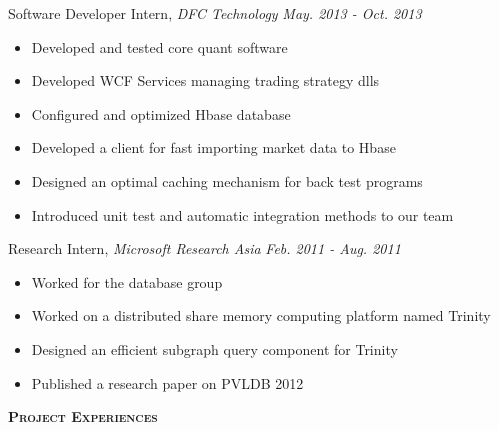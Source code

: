 \documentclass[9pt]{article}
\newenvironment{changemargin}[2]{%
  \begin{list}{}{%
    \setlength{\topsep}{0pt}%
    \setlength{\leftmargin}{#1}%
    \setlength{\rightmargin}{#2}%
    \setlength{\listparindent}{\parindent}%
    \setlength{\itemindent}{\parindent}%
    \setlength{\parsep}{\parskip}%
  }%
  \item[]}{\end{list}
}
\newcommand{\lineover}{
	\begin{changemargin}{-0.05in}{-0.05in}
		\vspace*{-8pt}
		\hrulefill \\
		\vspace*{-2pt}
	\end{changemargin}
}
\newcommand{\header}[1]{
	\begin{changemargin}{-0.5in}{-0.5in}
		\scshape{#1}\\
  	\lineover
	\end{changemargin}
}
\newenvironment{body} {
	\vspace*{-16pt}
	\begin{changemargin}{-0.25in}{-0.5in}
  }	
	{\end{changemargin}
}
\begin{document}
\begin{body}
	\vspace{14pt}
    Software Developer Intern, \emph{DFC Technology} \hfill \emph{May. 2013 - Oct. 2013}\\
    \vspace*{-4pt}
    \begin{itemize} \itemsep -0pt
    \item Developed and tested core quant software
    \item Developed WCF Services managing trading strategy dlls
    \item Configured and optimized Hbase database
    \item Developed a client for fast importing market data to Hbase
    \item Designed an optimal caching mechanism for back test programs
    \item Introduced unit test and automatic integration methods to our team
    \end{itemize}

    Research Intern, \emph{Microsoft Research Asia} \hfill \emph{Feb. 2011 - Aug. 2011}\\
    \vspace*{-4pt}
    \begin{itemize} \itemsep -0pt
        \item Worked for the database group
        \item Worked on a distributed share memory computing platform named Trinity
        \item Designed an efficient subgraph query component for Trinity
        \item Published a research paper on PVLDB 2012
    \end{itemize}
\end{body}

\smallskip


\header{\textbf{Project Experiences}}
\end{document}
